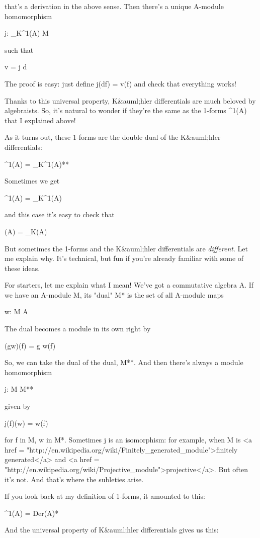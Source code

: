 that's a derivation in the above sense.  Then there's a unique
A-module homomorphism

j: \Omega _{K}^{1}(A) \to  M

such that

v = j d

The proof is easy: just define j(df) = v(f) and check that everything
works!

Thanks to this universal property, K&auml;hler differentials are much
beloved by algebraists.  So, it's natural to wonder if they're the
same as the 1-forms \Omega ^{1}(A) that I explained above!

As it turns out, these 1-forms are the double dual of the K&auml;hler
differentials:

\Omega ^{1}(A) = \Omega _{K}^{1}(A)**

Sometimes we get 

\Omega ^{1}(A) = \Omega _{K}^{1}(A)

and this case it's easy to check that

\Omega (A) = \Omega _{K}(A)

But sometimes the 1-forms and the K&auml;hler differentials are
\emph{different}.  Let me explain why.  It's technical, but fun
if you're already familiar with some of these ideas.

For starters, let me explain what I mean!  We've got a commutative
algebra A.  If we have an A-module M, its "dual" M* is the set of all
A-module maps

w: M \to  A

The dual becomes a module in its own right by

(gw)(f) = g w(f)

So, we can take the dual of the dual, M**.  And then there's always a
module homomorphism

j: M \to  M**

given by

j(f)(w) = w(f)

for f in M, w in M*.  Sometimes j is an isomorphism: for example, when
M is <a href = 
"http://en.wikipedia.org/wiki/Finitely_generated_module">finitely 
generated</a> and <a href = 
"http://en.wikipedia.org/wiki/Projective_module">projective</a>.  But often 
it's not.  And that's where the subleties arise.

If you look back at my definition of 1-forms, it amounted to this:

\Omega ^{1}(A) = Der(A)*

And the universal property of K&auml;hler differentials gives us this:

